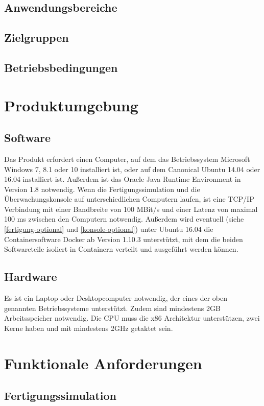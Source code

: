 \documentclass[parskip=full]{scrartcl}
\begin{document}
\subsection{Anwendungsbereiche}
\Blindtext[1]

\subsection{Zielgruppen}
\Blindtext[1]

\subsection{Betriebsbedingungen}
\Blindtext[1]

\section{Produktumgebung}
\subsection{Software}
Das Produkt erfordert einen Computer, auf dem das Betriebssystem Microsoft Windows 7, 8.1 oder 10 installiert ist,
oder auf dem Canonical Ubuntu 14.04 oder 16.04 installiert ist. Außerdem ist das Oracle Java Runtime Environment in Version 1.8
notwendig. Wenn die Fertigungssimulation und die Überwachungskonsole auf unterschiedlichen Computern laufen,
ist eine TCP/IP Verbindung mit einer Bandbreite von 100 MBit/s und einer Latenz von maximal 100 ms zwischen den Computern notwendig.
Außerdem wird eventuell (siehe \ref{fertigung-optional} und \ref{konsole-optional}) unter Ubuntu 16.04 die Containersoftware Docker
ab Version 1.10.3 unterstützt, mit dem die beiden Softwareteile isoliert in Containern verteilt und ausgeführt werden können.

\subsection{Hardware}
\label{Hardware}
Es ist ein Laptop oder Desktopcomputer notwendig, der eines der oben genannten Betriebssysteme unterstützt.
Zudem sind mindestens 2GB Arbeitsspeicher notwendig. Die CPU muss die x86 Architektur unterstützen, zwei Kerne haben und mit
mindestens 2GHz getaktet sein.

\section{Funktionale Anforderungen}
\subsection{Fertigungssimulation}
\end{document}
